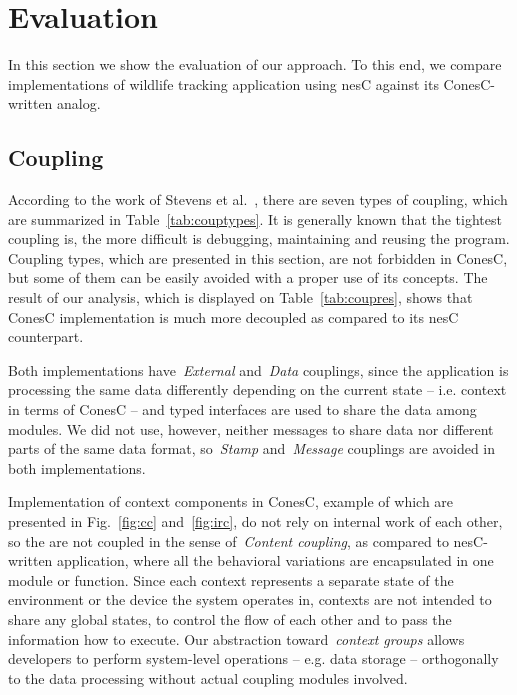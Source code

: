 \section{Evaluation}\label{sec:eval}

In this section we show the evaluation of our approach. To this end, we compare
implementations of wildlife tracking application using nesC against its ConesC-written analog.

\subsection{Coupling}\label{sec:evalcomp}

According to the work of Stevens et al.~\cite{stevens79}, there are seven types
of coupling, which are summarized in Table~\ref{tab:couptypes}. It is generally
known that the tightest coupling is, the more difficult is debugging,
maintaining and reusing the program. Coupling types, which are presented in this section, are not forbidden in ConesC, but some of them can be easily avoided with a proper use of its concepts. The result of our analysis, which is displayed on Table~\ref{tab:coupres}, shows that ConesC
implementation is much more decoupled as compared to its nesC counterpart. 

Both implementations have~\emph{External} and~\emph{Data} couplings, since the application is processing the same data differently depending on the current state -- i.e. context in terms of ConesC -- and typed interfaces are used to share the data among modules. We did not use, however, neither messages to share data nor different parts of the same data format, so~\emph{Stamp} and~\emph{Message} couplings are avoided in both implementations.

Implementation of context components in ConesC, example of which are presented in Fig.~\ref{fig:cc} and~\ref{fig:irc}, do not rely on internal work of each other, so the are not coupled in the sense of~\emph{Content coupling}, as compared to nesC-written application, where all the behavioral variations are encapsulated in one module or function. Since each context represents a separate state of the environment or the device the system operates in, contexts are not intended to share any global states, to control the flow of each other and to pass the information how to execute. Our abstraction toward~\emph{context
groups} allows developers to perform system-level operations -- e.g. data storage --
orthogonally to the data processing without actual coupling modules involved.


